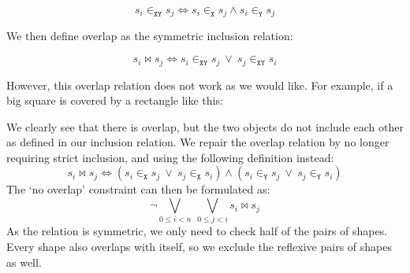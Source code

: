 \documentclass[12pt]{article}
\begin{document}
\[ s_i \in_{\texttt{XY}} s_j \iff s_i \in_{\texttt{X}} s_j \wedge s_i \in_{\texttt{Y}} s_j \]

We then define overlap as the symmetric inclusion relation:

\[ s_i \bowtie s_j \iff s_i \in_{\texttt{XY}} s_j ~\vee~ s_j \in_{\texttt{XY}} s_i \]

However, this overlap relation does not work as we would like.
For example, if a big square is covered by a rectangle like this:
\begin{center}
\end{center}

We clearly see that there is overlap, but the two objects do not include each other as defined in our inclusion relation.
We repair the overlap relation by no longer requiring strict inclusion, and using the following definition instead:
\[ s_i \bowtie s_j \iff (s_i \in_{\texttt{X}} s_j ~\vee~ s_j \in_{\texttt{X}} s_i) \wedge (s_i \in_{\texttt{Y}} s_j ~\vee~ s_j \in_{\texttt{Y}} s_i) \]
The `no overlap' constraint can then be formulated as:
\[ \neg \bigvee_{0 \le i < n} ~ \bigvee_{0 \le j < i} s_i \bowtie s_j \]
As the relation is symmetric, we only need to check half of the pairs of shapes.
Every shape also overlaps with itself, so we exclude the reflexive pairs of shapes as well.
\end{document}
